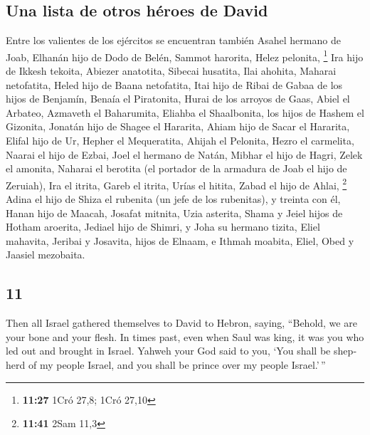 \begin{paracol}{2}
\hypertarget{una-lista-de-otros-huxe9roes-de-david}{%
\subsection{Una lista de otros héroes de
David}\label{una-lista-de-otros-huxe9roes-de-david}}

 Entre los valientes de los ejércitos se encuentran
también Asahel hermano de Joab, Elhanán hijo de Dodo de Belén,
 Sammot harorita, Helez pelonita, \footnote{\textbf{11:27}
  1Cró 27,8; 1Cró 27,10}  Ira hijo de Ikkesh tekoita,
Abiezer anatotita,  Sibecai husatita, Ilai ahohita,
 Maharai netofatita, Heled hijo de Baana netofatita,
 Itai hijo de Ribai de Gabaa de los hijos de Benjamín,
Benaía el Piratonita,  Hurai de los arroyos de Gaas,
Abiel el Arbateo,  Azmaveth el Baharumita, Eliahba el
Shaalbonita,  los hijos de Hashem el Gizonita, Jonatán
hijo de Shagee el Hararita,  Ahiam hijo de Sacar el
Hararita, Elifal hijo de Ur,  Hepher el Mequeratita,
Ahijah el Pelonita,  Hezro el carmelita, Naarai el hijo
de Ezbai,  Joel el hermano de Natán, Mibhar el hijo de
Hagri,  Zelek el amonita, Naharai el berotita (el
portador de la armadura de Joab el hijo de Zeruiah),  Ira
el itrita, Gareb el itrita,  Urías el hitita, Zabad el
hijo de Ahlai, \footnote{\textbf{11:41} 2Sam 11,3}  Adina
el hijo de Shiza el rubenita (un jefe de los rubenitas), y treinta con
él,  Hanan hijo de Maacah, Josafat mitnita,
 Uzia asterita, Shama y Jeiel hijos de Hotham aroerita,
 Jediael hijo de Shimri, y Joha su hermano tizita,
 Eliel mahavita, Jeribai y Josavita, hijos de Elnaam, e
Ithmah moabita,  Eliel, Obed y Jaasiel mezobaita.

\switchcolumn
\begin{otherlanguage}{english}

\hypertarget{section-21}{%
\section{11}\label{section-21}}

 Then all Israel gathered themselves to David to Hebron,
saying, ``Behold, we are your bone and your flesh.  In
times past, even when Saul was king, it was you who led out and brought
in Israel. Yahweh your God said to you, `You shall be shepherd of my
people Israel, and you shall be prince over my people Israel.'\,''


\end{otherlanguage}
\end{paracol}
